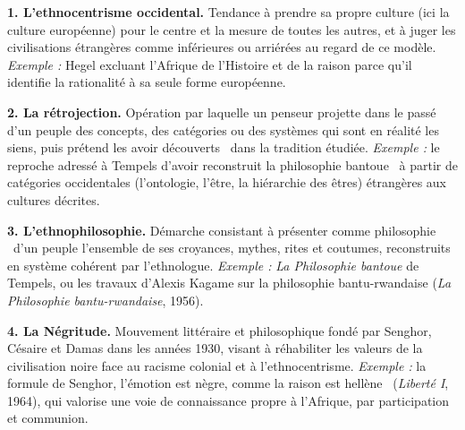 \documentclass[11pt]{article}
\begin{document}
\begin{corrige}

\textbf{1. L'ethnocentrisme occidental.} Tendance à prendre sa propre culture (ici la culture européenne) pour le centre et la mesure de toutes les autres, et à juger les civilisations étrangères comme inférieures ou arriérées au regard de ce modèle. \emph{Exemple :} Hegel excluant l'Afrique de l'Histoire et de la raison parce qu'il identifie la rationalité à sa seule forme européenne.

\textbf{2. La rétrojection.} Opération par laquelle un penseur projette dans le passé d'un peuple des concepts, des catégories ou des systèmes qui sont en réalité les siens, puis prétend les avoir \guillemotleft découverts \guillemotright\ dans la tradition étudiée. \emph{Exemple :} le reproche adressé à Tempels d'avoir reconstruit la \guillemotleft philosophie bantoue \guillemotright\ à partir de catégories occidentales (l'ontologie, l'être, la hiérarchie des êtres) étrangères aux cultures décrites.

\textbf{3. L'ethnophilosophie.} Démarche consistant à présenter comme \guillemotleft philosophie \guillemotright\ d'un peuple l'ensemble de ses croyances, mythes, rites et coutumes, reconstruits en système cohérent par l'ethnologue. \emph{Exemple :} \emph{La Philosophie bantoue} de Tempels, ou les travaux d'Alexis Kagame sur la philosophie bantu-rwandaise (\emph{La Philosophie bantu-rwandaise}, 1956).

\textbf{4. La Négritude.} Mouvement littéraire et philosophique fondé par Senghor, Césaire et Damas dans les années 1930, visant à réhabiliter les valeurs de la civilisation noire face au racisme colonial et à l'ethnocentrisme. \emph{Exemple :} la formule de Senghor, \guillemotleft l'émotion est nègre, comme la raison est hellène \guillemotright\ (\emph{Liberté I}, 1964), qui valorise une voie de connaissance propre à l'Afrique, par participation et communion.

\end{corrige}
\end{document}
